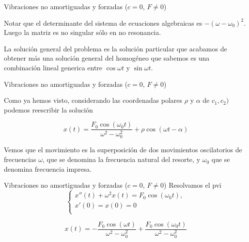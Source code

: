 \documentclass[handout,hyperref={colorlinks=true}]{beamer}
\renewcommand{\emph}[1]{\textcolor[rgb]{1,0,0}{#1}}
\begin{document}
\begin{frame}{ Vibraciones no amortiguadas y forzadas ($c=0$, $F\neq 0$) }
 

 
Notar que el determinante del sistema de ecuaciones algebraicas es $-(\omega-\omega_0)^2$. Luego la matriz 
es no singular sólo en no resonancia. 

La solución general del problema es la solución particular que acabamos de obtener más una solución 
general del homogéneo que sabemos es una combinación lineal generica entre $\cos \omega t$ y $\sin \omega t$.


 
 
\end{frame}

\begin{frame}{ Vibraciones no amortiguadas y forzadas ($c=0$, $F\neq 0$) }

Como ya hemos visto, considerando las coordenadas polares $\rho$ y $\alpha$ de $c_1,c_2)$
podemos reescribir la solución 


\[x(t)=\frac{F_{0} \cos\left(\omega_{0} t\right)}{\omega^{2} - \omega_{0}^{2}}+
\rho\cos(\omega t-\alpha)
\]

Vemos que el movimiento es la superposición de dos movimientos oscilatorios de frecuencias $\omega$, que se
denomina la \emph{frecuencia natural} del resorte, y $\omega_0$ que se denomina \emph{frecuencia impresa}.
 
\end{frame}



\begin{frame}{ Vibraciones no amortiguadas y forzadas ($c=0$, $F\neq 0$) }
Resolvamos el pvi
\[
 \left\{\begin{array}{l}
         x''(t)+\omega^2x(t)=F_0\cos(\omega_0 t),\\
         x'(0)=x(0)=0\\
        \end{array}
\right.
\]


\lstI

\[x(t)=-\frac{F_{0} \cos\left(\omega t\right)}{\omega^{2} - \omega_{0}^{2}} + \frac{F_{0} \cos\left(\omega_{0} t\right)}{\omega^{2} - \omega_{0}^{2}}
\]
\end{frame}
\end{document}
